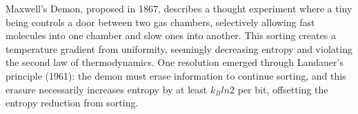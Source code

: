 Maxwell's Demon, proposed in 1867, describes a thought experiment where a tiny being controls a door between two gas chambers, selectively allowing fast molecules into one chamber and slow ones into another. This sorting creates a temperature gradient from uniformity, seemingly decreasing entropy and violating the second law of thermodynamics. One resolution emerged through Landauer's principle (1961): the demon must erase information to continue sorting, and this erasure necessarily increases entropy by at least $k_B ln 2$ per bit, offsetting the entropy reduction from sorting. 
